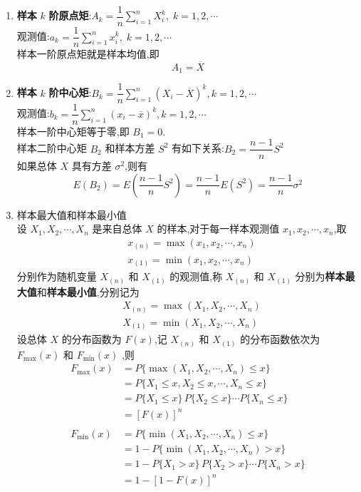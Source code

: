 \begin{enumerate}
    \item \textbf{样本} $k$ \textbf{阶原点矩}:$A_k = \dfrac{1}{n} \displaystyle\sum_{i=1}^n X_i^k, \; k=1,2,\cdots$ \\[0.5em]
    观测值:$a_k = \dfrac{1}{n} \displaystyle\sum_{i=1}^n x_i^k, \; k=1,2,\cdots$ \\[0.5em]
    样本一阶原点矩就是样本均值,即
    $$
    A_1 = \overline{X}
    $$

    \item \textbf{样本} $k$ \textbf{阶中心矩}:$B_k = \dfrac{1}{n} \displaystyle\sum_{i=1}^n (X_i - \overline{X})^k, k=1,2,\cdots$ \\[0.5em]
    观测值:$b_k = \dfrac{1}{n} \displaystyle\sum_{i=1}^n (x_i - \overline{x})^k, k=1,2,\cdots$ \\[0.5em]
    样本一阶中心矩等于零,即 $B_1 = 0$. \\
    样本二阶中心矩 $B_2$ 和样本方差 $S^2$ 有如下关系:$B_2 = \dfrac{n-1}{n} S^2$\\
    如果总体 $X$ 具有方差 $\sigma^2$,则有
    $$
    E(B_2) = E(\dfrac{n-1}{n} S^2) = \dfrac{n-1}{n} E(S^2) = \dfrac{n-1}{n} \sigma^2
    $$

    \item 样本最大值和样本最小值 \\
    设 $X_1, X_2, \cdots, X_n$ 是来自总体 $X$ 的样本,对于每一样本观测值 $x_1, x_2, \cdots, x_n$,取
    $$
    \begin{aligned}
        & x_{(n)} = \max(x_1, x_2, \cdots, x_n) \\
        & x_{(1)} = \min(x_1, x_2, \cdots, x_n)
    \end{aligned}
    $$
    分别作为随机变量 $X_{(n)}$ 和 $X_{(1)}$ 的观测值,称 $X_{(n)}$ 和 $X_{(1)}$ 分别为\textbf{样本最大值}和\textbf{样本最小值},分别记为
    $$
    \begin{aligned}
        & X_{(n)} = \max(X_1, X_2, \cdots, X_n) \\
        & X_{(1)} = \min(X_1, X_2, \cdots, X_n)
    \end{aligned}
    $$
    设总体 $X$ 的分布函数为 $F(x)$,记 $X_{(n)}$ 和 $X_{(1)}$ 的分布函数依次为 $F_{\text{max}}(x)$ 和 $F_{\text{min}}(x)$ ,则
    $$
    \begin{aligned}
        F_{\text{max}}(x) &= P \{ \max(X_1, X_2, \cdots, X_n) \leqslant x \} \\
        &= P \{ X_1 \leqslant x, X_2 \leqslant x, \cdots, X_n \leqslant x \} \\
        &= P \{ X_1 \leqslant x \} \, P \{ X_2 \leqslant x \} \cdots P \{ X_n \leqslant x \} \\
        &= [F(x)]^n \\
        \\
        F_{\text{min}}(x) &= P \{ \min(X_1, X_2, \cdots, X_n) \leqslant x \} \\
        &= 1 - P \{ \min(X_1, X_2, \cdots, X_n) > x \} \\
        &= 1 - P \{ X_1 > x \} \, P \{ X_2 > x \} \cdots P \{ X_n > x \} \\
        &= 1-[1-F(x)]^n
    \end{aligned}
    $$
\end{enumerate}

